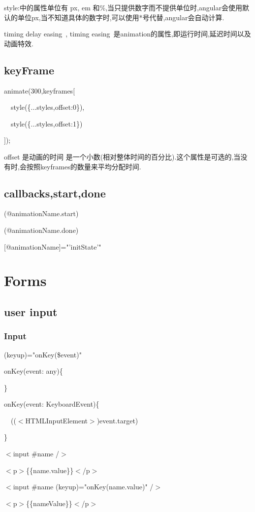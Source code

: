 \documentclass{article}
\begin{document}
style:中的属性单位有 px, em 和\%,当只提供数字而不提供单位时,angular会使用默认的单位px,当不知道具体的数字时,可以使用*号代替,angular会自动计算.

timing delay easing\ ,
timing easing\ 是animation的属性,即运行时间,延迟时间以及动画特效.

\subsection{keyFrame}
\par animate(300,keyframes$[$
\par\ \ style(\{...styles,offset:0\}),
\par\ \ style(\{...styles,offset:1\}) 
\par $]$);

offset 是动画的时间 是一个小数(相对整体时间的百分比).这个属性是可选的,当没有时,会按照keyframes的数量来平均分配时间.
\subsection{callbacks,start,done}

(@animationName.start)

(@animationName.done)

[@animationName]="'initState'"

\section{Forms}
\subsection{user input}
\subsubsection{Input}
(keyup)="onKey(\$event)"

onKey(event: any)\{

\}

onKey(event: KeyboardEvent)\{
\par\ \ (($<$HTMLInputElement$>$)event.target) 
\par\}


$<$input \#name /$>$
\par $<$p$>$\{\{name.value\}\}$<$/p$>$


$<$input \#name (keyup)="onKey(name.value)" /$>$
\par $<$p$>$\{\{nameValue\}\}$<$/p$>$
\end{document}
